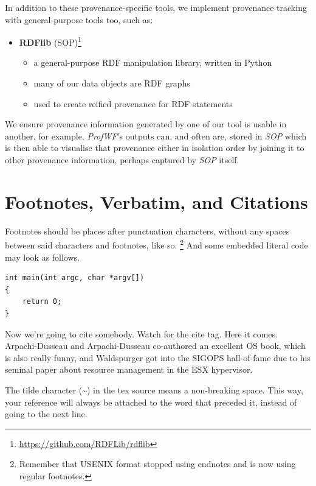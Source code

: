 \documentclass[letterpaper,twocolumn,10pt]{article}
\begin{document}
In addition to these provenance-specific tools, we implement provenance tracking with general-purpose tools too, such as:

\begin{itemize}
  \item \textbf{RDFlib} (SOP)\footnote{\url{https://github.com/RDFLib/rdflib}}
  \begin{itemize}
    \item a general-purpose RDF manipulation library, written in Python
    \item many of our data objects are RDF graphs
    \item used to create reified provenance for RDF statements     
  \end{itemize}
\end{itemize}  

We ensure provenance information generated by one of our tool is usable in another, for example, \textit{ProfWF}'s outputs
can, and often are, stored in \textit{SOP} which is then able to visualise that provenance either in isolation order
by joining it to other provenance information, perhaps captured by \textit{SOP} itself.


\section{Footnotes, Verbatim, and Citations}

Footnotes should be places after punctuation characters, without any
spaces between said characters and footnotes, like so.%
\footnote{Remember that USENIX format stopped using endnotes and is
  now using regular footnotes.} And some embedded literal code may
look as follows.

\begin{verbatim}
int main(int argc, char *argv[]) 
{
    return 0;
}
\end{verbatim}

Now we're going to cite somebody. Watch for the cite tag. Here it
comes. Arpachi-Dusseau and Arpachi-Dusseau co-authored an excellent OS
book, which is also really funny, and
Waldspurger got into the SIGOPS hall-of-fame due to his seminal paper
about resource management in the ESX hypervisor.

The tilde character (\~{}) in the tex source means a non-breaking
space. This way, your reference will always be attached to the word
that preceded it, instead of going to the next line.
\end{document}
